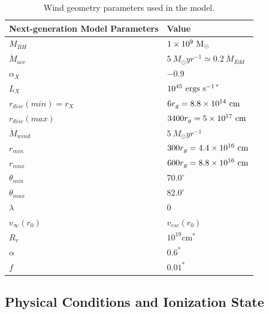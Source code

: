 \documentclass[useAMS,usenatbib]{mn2e_x}
\begin{document}
\begin{table}
\begin{tabular}{p{3cm}p{4cm}}
\hline Next-generation Model Parameters 	&	 Value \\ 
\hline \hline 
$M_{BH}$ 	 &	 $1\times 10^9~\rm{M_{\odot}}$ \\ 
$\dot{M}_{acc}$ 	 &	 $5~M_{\odot}yr^{-1} \simeq 0.2~\dot{M}_{Edd}$\\ 
$\alpha_X$ 	 &	 $-0.9$ \\ 
$L_{X} $ 	 &	 $10^{45}~\rm{ergs~s^{-1}}$$^*$ \\ 
$r_{disc}(min)=r_{X}$   &	 $6r_g=8.8\times10^{14}~{\rm cm}$ \\ 
$r_{disc}(max)$   &	 $3400r_g = 5\times10^{17}~{\rm cm}$ \\ 
$\dot{M}_{wind}$  &	 $5~M_{\odot}yr^{-1}$ \\ 
$r_{min}$ 	&	 $300r_{g} = 4.4\times10^{16}~{\rm cm}$\\ 
$r_{max}$ 	&	 $600r_{g} = 8.8\times10^{16}~{\rm cm}$ \\ 
$\theta_{min}$ 	&	 $70.0^{\circ}$ \\ 
$\theta_{max}$ 	&	 $82.0^{\circ}$ \\ 
$\lambda$ 	&	 $0$ \\ 
$v_{\infty}(r_0)$ 	&	 $v_{esc}(r_0)$ \\ 
$R_v$  	        &	 $10^{19}$cm$^*$ \\ 
$\alpha$ 	&	 $0.6^*$ \\
$f$ 	&	 $0.01^*$  \\
\hline 
\end{tabular}
\caption{Wind geometry parameters used in the model.}
\label{wind_param}
\end{table}



\subsection{Physical Conditions and Ionization State}
\end{document}
